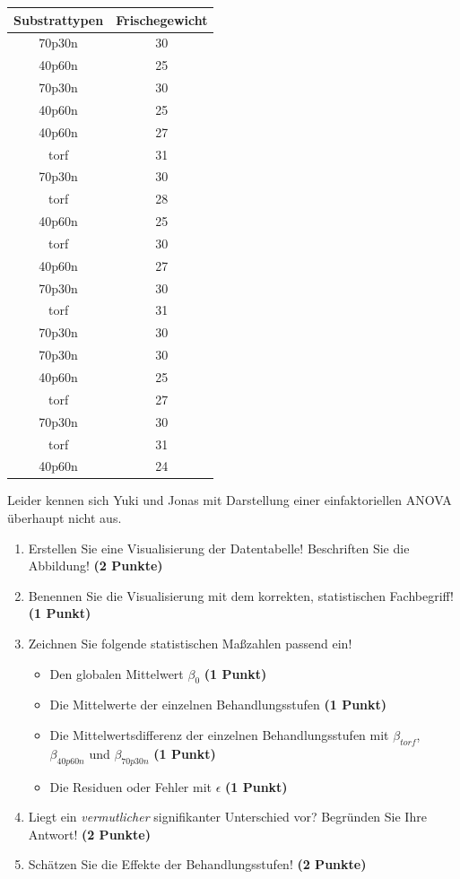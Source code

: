 \documentclass[a4paper, 9pt]{scrartcl}\usepackage[]{graphicx}\usepackage[]{xcolor}
\newenvironment{knitrout}{}{} %
\begin{document}
\begin{knitrout}
\color{fgcolor}\begin{table}[!h]
\centering
\begin{tabular}{cc}
\toprule
Substrattypen & Frischegewicht\\
\midrule
70p30n & 30\\
40p60n & 25\\
70p30n & 30\\
40p60n & 25\\
40p60n & 27\\
\addlinespace
torf & 31\\
70p30n & 30\\
torf & 28\\
40p60n & 25\\
torf & 30\\
\addlinespace
40p60n & 27\\
70p30n & 30\\
torf & 31\\
70p30n & 30\\
70p30n & 30\\
\addlinespace
40p60n & 25\\
torf & 27\\
70p30n & 30\\
torf & 31\\
40p60n & 24\\
\bottomrule
\end{tabular}
\end{table}

\end{knitrout}

Leider kennen sich Yuki und Jonas mit Darstellung einer einfaktoriellen ANOVA überhaupt nicht aus. 

\begin{enumerate}
\item Erstellen  Sie  eine  Visualisierung  der  Datentabelle! Beschriften  Sie  die  Abbildung! \textbf{(2 Punkte)}
\item Benennen Sie die Visualisierung mit dem korrekten, statistischen Fachbegriff! \textbf{(1 Punkt)}
\item Zeichnen Sie folgende statistischen Maßzahlen passend ein! 
  \begin{itemize}
  \item Den globalen Mittelwert $\beta_0$ \textbf{(1 Punkt)}
  \item Die Mittelwerte der einzelnen Behandlungsstufen \textbf{(1 Punkt)}
  \item Die Mittelwertsdifferenz der einzelnen Behandlungsstufen mit $\beta_{torf}$, $\beta_{40p60n}$ und $\beta_{70p30n}$ \textbf{(1 Punkt)}
  \item Die Residuen oder Fehler mit $\epsilon$ \textbf{(1 Punkt)}
  \end{itemize}
\item Liegt ein \textit{vermutlicher} signifikanter Unterschied vor? Begründen Sie Ihre Antwort! \textbf{(2 Punkte)}
\item Schätzen Sie die Effekte der Behandlungsstufen! \textbf{(2 Punkte)}
\end{enumerate}
 
\end{document}
